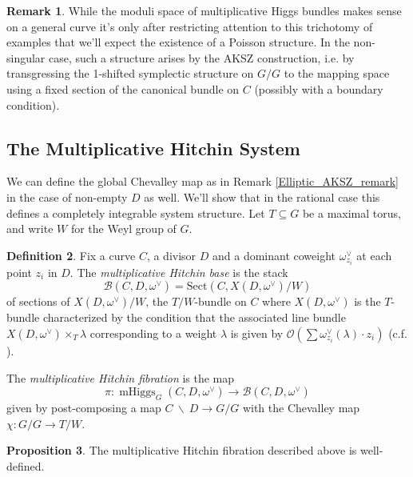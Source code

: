 \documentclass[11pt, oneside, reqno]{amsart}
\theoremstyle{definition} \newtheorem{definition}{Definition}[section]
\newtheorem{prop}[definition]{Proposition}
\theoremstyle{definition} \newtheorem{remark}[definition]{Remark}
\theoremstyle{definition} \newtheorem{remarks}[definition]{Remarks}
\theoremstyle{definition} \newtheorem{question}[definition]{Question}
\theoremstyle{definition} \newtheorem*{note}{Note}
\theoremstyle{definition} \newtheorem{example}[definition]{Example}
\theoremstyle{definition} \newtheorem{examples}[definition]{Examples}
\newcommand{\mr}[1]{\mathrm{#1}}
\newcommand{\mc}[1]{\mathcal{#1}}
\newcommand{\bs}{\ \backslash \ }
\newcommand{\OO}{\mathcal{O}}
\newcommand{\sub}{\subseteq}
\DeclareMathOperator{\mhiggs}{mHiggs}
\begin{document}
\begin{remark}
While the moduli space of multiplicative Higgs bundles makes sense on a general curve it's only after restricting attention to this trichotomy of examples that we'll expect the existence of a Poisson structure.  In the non-singular case, such a structure arises by the AKSZ construction, i.e. by transgressing the 1-shifted symplectic structure on $G/G$ to the mapping space using a fixed section of the canonical bundle on $C$ (possibly with a boundary condition).  
\end{remark}

\subsection{The Multiplicative Hitchin System} \label{Hitchin_system_section}
We can define the global Chevalley map as in Remark \ref{Elliptic_AKSZ_remark} in the case of non-empty $D$ as well.  We'll show that in the rational case this defines a completely integrable system structure.  Let $T \sub G$ be a maximal torus, and write $W$ for the Weyl group of $G$.

\begin{definition} \label{mult_Hitchin_system_def}
Fix a curve $C$, a divisor $D$ and a dominant coweight $\omega_{z_i}^\vee$ at each point $z_i$ in $D$.  The \emph{multiplicative Hitchin base} is the stack
\[\mc B(C,D,\omega^\vee) = \mr{Sect}(C, X(D,\omega^\vee)/W)\]
of sections of $X(D,\omega^\vee)/W$, the $T/W$-bundle on $C$ where $X(D,\omega^\vee)$ is the $T$-bundle characterized by the condition that the associated line bundle $X(D,\omega^\vee) \times_T {\lambda}$ corresponding to a weight $\lambda$ is given by $\OO(\sum \omega_{z_i}^\vee(\lambda) \cdot z_i)$ (c.f. \cite[Section 3.3]{HurtubiseMarkman}).

The \emph{multiplicative Hitchin fibration} is the map
\[\pi \colon \mhiggs_G(C,D,\omega^\vee) \to \mc B(C,D,\omega^\vee)\]
given by post-composing a map $C \bs D \to G/G$ with the Chevalley map $\chi \colon G/G \to T/W$.  
\end{definition}

\begin{prop}
The multiplicative Hitchin fibration described above is well-defined.
\end{prop}
\end{document}
